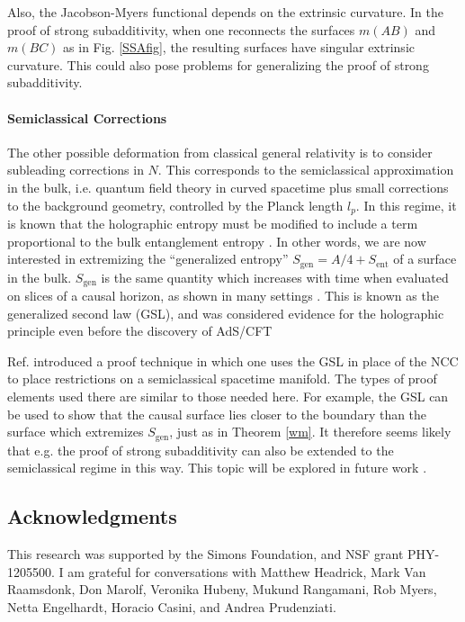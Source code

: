 \documentclass{article}
\begin{document}
Also, the Jacobson-Myers functional depends on the extrinsic curvature.  In the proof of strong subadditivity, when one reconnects the surfaces $m(AB)$ and $m(BC)$ as in Fig. \ref{SSAfig}, the resulting surfaces have singular extrinsic curvature.  This could also pose problems for generalizing the proof of strong subadditivity.

\paragraph{Semiclassical Corrections}

The other possible deformation from classical general relativity is to consider subleading corrections in $N$.  This corresponds to the semiclassical approximation in the bulk, i.e. quantum field theory in curved spacetime plus small corrections to the background geometry, controlled by the Planck length $l_p$.  In this regime, it is known that the holographic entropy must be modified to include a term proportional to the bulk entanglement entropy \cite{FLM13, SR, BDHM}.  In other words, we are now interested in extremizing the ``generalized entropy'' $S_\mathrm{gen} = A/4 + S_\mathrm{ent}$ of a surface in the bulk.  $S_\mathrm{gen}$ is the same quantity which increases with time when evaluated on slices of a causal horizon, as shown in many settings \cite{10proofs,null}.  This is known as the generalized second law (GSL), and was considered evidence for the holographic principle even before the discovery of AdS/CFT \cite{susskind94}

Ref. \cite{sing} introduced a proof technique in which one uses the GSL in place of the NCC to place restrictions on a semiclassical spacetime manifold.  The types of proof elements used there are similar to those needed here.  For example, the GSL can be used to show that the causal surface lies closer to the boundary than the surface which extremizes $S_\mathrm{gen}$, just as in Theorem \ref{wm}.  It therefore seems likely that e.g. the proof of strong subadditivity can also be extended to the semiclassical regime in this way.  This topic will be explored in future work \cite{NW}.

\subsection*{Acknowledgments}
This research was supported by the Simons Foundation, and NSF grant PHY-1205500.  I am grateful for conversations with Matthew Headrick, Mark Van Raamsdonk, Don Marolf, Veronika Hubeny, Mukund Rangamani, Rob Myers, Netta Engelhardt, Horacio Casini, and Andrea Prudenziati.
\end{document}
